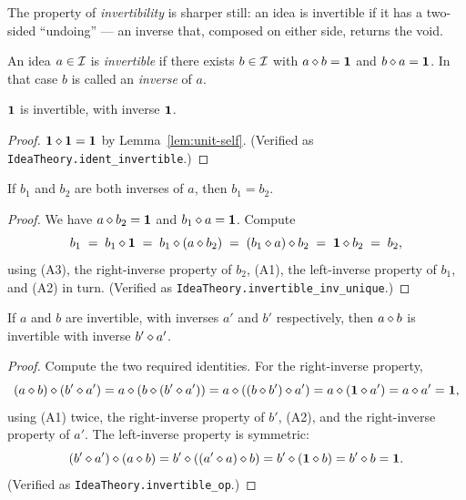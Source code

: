 The property of \emph{invertibility} is sharper still: an idea is
invertible if it has a two-sided ``undoing'' --- an inverse that, composed
on either side, returns the void.

\begin{definition}\label{def:invertible}
An idea $a \in \mathcal{I}$ is \emph{invertible} if there exists $b \in \mathcal{I}$
with $a \mathbin{\diamond} b = \mathbf{1}$ and $b \mathbin{\diamond} a = \mathbf{1}$.  In that case $b$
is called an \emph{inverse} of $a$.
\end{definition}

\begin{lemma}\label{lem:unit-inv}
$\mathbf{1}$ is invertible, with inverse $\mathbf{1}$.
\end{lemma}

\begin{proof}
$\mathbf{1} \mathbin{\diamond} \mathbf{1} = \mathbf{1}$ by Lemma~\ref{lem:unit-self}.
(Verified as \texttt{IdeaTheory.ident\_invertible}.)
\end{proof}

\begin{lemma}\label{lem:inv-unique}
If $b_1$ and $b_2$ are both inverses of $a$, then $b_1 = b_2$.
\end{lemma}

\begin{proof}
We have $a \mathbin{\diamond} b_2 = \mathbf{1}$ and $b_1 \mathbin{\diamond} a = \mathbf{1}$.  Compute
\[
b_1 \;=\; b_1 \mathbin{\diamond} \mathbf{1}
     \;=\; b_1 \mathbin{\diamond} (a \mathbin{\diamond} b_2)
     \;=\; (b_1 \mathbin{\diamond} a) \mathbin{\diamond} b_2
     \;=\; \mathbf{1} \mathbin{\diamond} b_2
     \;=\; b_2,
\]
using (A3), the right-inverse property of $b_2$, (A1), the left-inverse
property of $b_1$, and (A2) in turn.  (Verified as
\texttt{IdeaTheory.invertible\_inv\_unique}.)
\end{proof}

\begin{lemma}\label{lem:inv-compose}
If $a$ and $b$ are invertible, with inverses $a'$ and $b'$ respectively,
then $a \mathbin{\diamond} b$ is invertible with inverse $b' \mathbin{\diamond} a'$.
\end{lemma}

\begin{proof}
Compute the two required identities.  For the right-inverse property,
\[
(a \mathbin{\diamond} b) \mathbin{\diamond} (b' \mathbin{\diamond} a')
= a \mathbin{\diamond} (b \mathbin{\diamond} (b' \mathbin{\diamond} a'))
= a \mathbin{\diamond} ((b \mathbin{\diamond} b') \mathbin{\diamond} a')
= a \mathbin{\diamond} (\mathbf{1} \mathbin{\diamond} a')
= a \mathbin{\diamond} a'
= \mathbf{1},
\]
using (A1) twice, the right-inverse property of $b'$, (A2), and the
right-inverse property of $a'$.  The left-inverse property is symmetric:
\[
(b' \mathbin{\diamond} a') \mathbin{\diamond} (a \mathbin{\diamond} b)
= b' \mathbin{\diamond} ((a' \mathbin{\diamond} a) \mathbin{\diamond} b)
= b' \mathbin{\diamond} (\mathbf{1} \mathbin{\diamond} b)
= b' \mathbin{\diamond} b
= \mathbf{1}.
\]
(Verified as \texttt{IdeaTheory.invertible\_op}.)
\end{proof}

